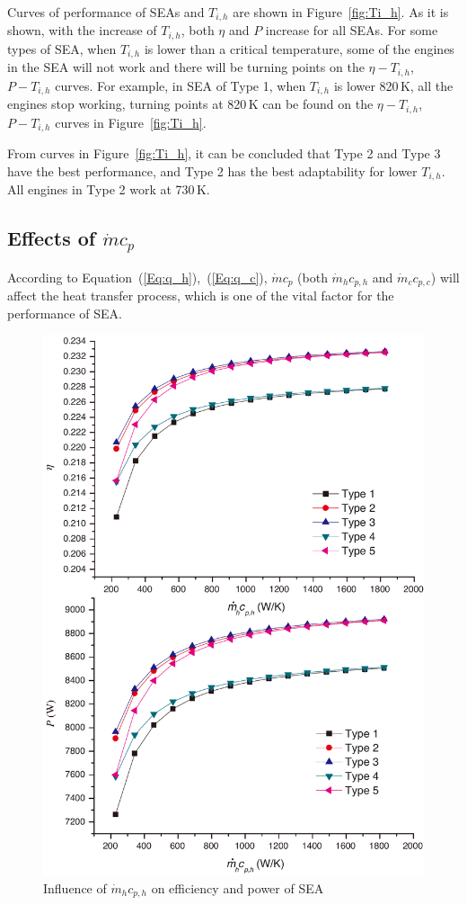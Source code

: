 Curves of performance of SEAs and $T_{i,h}$ are shown in Figure~\ref{fig:Ti_h}.
As it is shown, with the increase of $T_{i,h}$, both $\eta$ and $P$ increase for all SEAs. For some types of SEA, when $T_{i,h}$ is lower than a critical temperature, some of the engines in the SEA will not work and there will be turning points on the $\eta-T_{i,h}$, $P-T_{i,h}$ curves. For example, in SEA of Type 1, when $T_{i,h}$ is lower 820\,K, all the engines stop working, turning points at 820\,K can be found on the $\eta-T_{i,h}$, $P-T_{i,h}$ curves in Figure~\ref{fig:Ti_h}. 

From curves in Figure~\ref{fig:Ti_h}, it can be concluded that Type 2 and Type 3 have the best performance, and Type 2 has the best adaptability for lower $T_{i,h}$. All engines in Type 2 work at 730\,K.

\subsection{Effects of $\dot{m}c_p$}

According to Equation~(\ref{Eq:q_h}),~(\ref{Eq:q_c}), $\dot{m}c_p$ (both $\dot{m}_hc_{p,h}$ and $\dot{m}_cc_{p,c}$) will affect the heat transfer process, which is one of the vital factor for the performance of SEA.


\noindent \begin{figure}[htbp]
\begin{center}
	\includegraphics[width = 0.7\columnwidth]{fig/qm_hcp_h}
	\caption{Influence of $\dot{m}_hc_{p,h}$ on efficiency and power of SEA}
	\label{fig:qm_hcp_h}
\end{center}
\end{figure}

